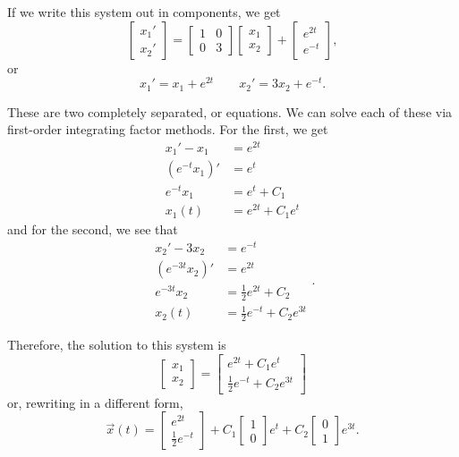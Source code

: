 \documentclass{ximera}
\begin{document}
\begin{exampleSol}
    If we write this system out in components, we get 
    \[ 
        \begin{bmatrix} x_1' \\ x_2' \end{bmatrix} = \begin{bmatrix}1& 0 \\ 0 & 3 \end{bmatrix}\begin{bmatrix} x_1 \\ x_2 \end{bmatrix} + \begin{bmatrix} e^{2t} \\ e^{-t} \end{bmatrix}, 
    \] 
    or 
    \[ 
        x_1' = x_1 + e^{2t} \qquad x_2' = 3x_2 + e^{-t}.
    \]
    
    These are two completely separated, or \emph{} equations. We can solve each of these via first-order integrating factor methods. For the first, we get
    \[
        \begin{split}
            x_1' - x_1 &= e^{2t} \\
            (e^{-t}x_1)' &= e^{t} \\
            e^{-t}x_1 &= e^t + C_1 \\
            x_1(t) &= e^{2t} + C_1e^t
        \end{split}
    \]
    and for the second, we see that
    \[
        \begin{split}
            x_2' - 3x_2 &= e^{-t} \\
            (e^{-3t}x_2)' &= e^{2t} \\
            e^{-3t}x_2 &= \frac{1}{2}e^{2t} + C_2 \\
            x_2(t) &= \frac{1}{2}e^{-t} + C_2e^{3t}
        \end{split}.
    \]
    
    Therefore, the solution to this system is
    \[ 
        \begin{bmatrix} x_1 \\ x_2 \end{bmatrix} = \begin{bmatrix}e^{2t} + C_1e^t \\ \frac{1}{2}e^{-t} + C_2e^{3t} \end{bmatrix} 
    \] 
    or, rewriting in a different form,
    \[ 
        \vec{x}(t) = \begin{bmatrix} e^{2t} \\ \frac{1}{2}e^{-t} \end{bmatrix} + C_1 \begin{bmatrix} 1 \\ 0 \end{bmatrix} e^{t} + C_2 \begin{bmatrix} 0 \\ 1 \end{bmatrix} e^{3t}.
    \]
\end{exampleSol}
\end{document}
